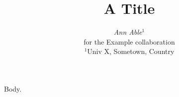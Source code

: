 \documentclass{article}
\begin{document}
\title{A Title}
\author{{\slshape Ann Able$^1$}\\ {\footnotesize for the Example collaboration}\\[1ex]
$^1$Univ X, Sometown, Country\\}
\maketitle
Body.
\end{document}
